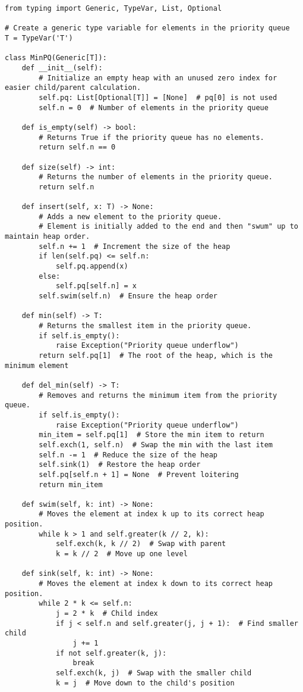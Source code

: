 \documentclass{article}
\begin{document}
\begin{verbatim}
from typing import Generic, TypeVar, List, Optional

# Create a generic type variable for elements in the priority queue
T = TypeVar('T')

class MinPQ(Generic[T]):
    def __init__(self):
        # Initialize an empty heap with an unused zero index for easier child/parent calculation.
        self.pq: List[Optional[T]] = [None]  # pq[0] is not used
        self.n = 0  # Number of elements in the priority queue

    def is_empty(self) -> bool:
        # Returns True if the priority queue has no elements.
        return self.n == 0

    def size(self) -> int:
        # Returns the number of elements in the priority queue.
        return self.n

    def insert(self, x: T) -> None:
        # Adds a new element to the priority queue.
        # Element is initially added to the end and then "swum" up to maintain heap order.
        self.n += 1  # Increment the size of the heap
        if len(self.pq) <= self.n:
            self.pq.append(x)
        else:
            self.pq[self.n] = x
        self.swim(self.n)  # Ensure the heap order

    def min(self) -> T:
        # Returns the smallest item in the priority queue.
        if self.is_empty():
            raise Exception("Priority queue underflow")
        return self.pq[1]  # The root of the heap, which is the minimum element

    def del_min(self) -> T:
        # Removes and returns the minimum item from the priority queue.
        if self.is_empty():
            raise Exception("Priority queue underflow")
        min_item = self.pq[1]  # Store the min item to return
        self.exch(1, self.n)  # Swap the min with the last item
        self.n -= 1  # Reduce the size of the heap
        self.sink(1)  # Restore the heap order
        self.pq[self.n + 1] = None  # Prevent loitering
        return min_item

    def swim(self, k: int) -> None:
        # Moves the element at index k up to its correct heap position.
        while k > 1 and self.greater(k // 2, k):
            self.exch(k, k // 2)  # Swap with parent
            k = k // 2  # Move up one level

    def sink(self, k: int) -> None:
        # Moves the element at index k down to its correct heap position.
        while 2 * k <= self.n:
            j = 2 * k  # Child index
            if j < self.n and self.greater(j, j + 1):  # Find smaller child
                j += 1
            if not self.greater(k, j):
                break
            self.exch(k, j)  # Swap with the smaller child
            k = j  # Move down to the child's position


\end{verbatim}
\end{document}
